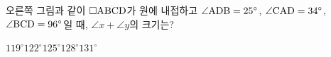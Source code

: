 \noindent\begin{minipage}[t]{0.58\linewidth}\vspace{0pt}\raggedright 오른쪽 그림과 같이 $\square\mathrm{ABCD}$가 원에 내접하고 $\angle\mathrm{ADB}=25^\circ$, $\angle\mathrm{CAD}=34^\circ$, $\angle\mathrm{BCD}=96^\circ$일 때, $\angle x+\angle y$의 크기는?\end{minipage}\hfill\begin{minipage}[t]{0.4\linewidth}\vspace{0pt}\centering \resizebox{\ifdim\width>\linewidth\linewidth\else\width\fi}{!}{}\end{minipage}\par
\begin{choices32}{$119^\circ$}{$122^\circ$}{$125^\circ$}{$128^\circ$}{$131^\circ$}\end{choices32}
